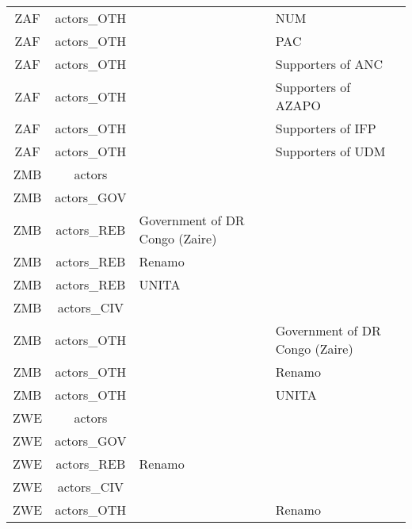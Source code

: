 \documentclass[12pt]{article}
\begin{document}
\begin{center}
\begin{longtable}{|c|c|p{7cm}|p{7cm}|}
  ZAF & actors\_OTH &  & NUM \\ 
  ZAF & actors\_OTH &  & PAC \\ 
  ZAF & actors\_OTH &  & Supporters of ANC \\ 
  ZAF & actors\_OTH &  & Supporters of AZAPO \\ 
  ZAF & actors\_OTH &  & Supporters of IFP \\ 
  ZAF & actors\_OTH &  & Supporters of UDM \\ 
  ZMB & actors &  &  \\ 
  ZMB & actors\_GOV &  &  \\ 
  ZMB & actors\_REB & Government of DR Congo (Zaire) &  \\ 
  ZMB & actors\_REB & Renamo &  \\ 
  ZMB & actors\_REB & UNITA &  \\ 
  ZMB & actors\_CIV &  &  \\ 
  ZMB & actors\_OTH &  & Government of DR Congo (Zaire) \\ 
  ZMB & actors\_OTH &  & Renamo \\ 
  ZMB & actors\_OTH &  & UNITA \\ 
  ZWE & actors &  &  \\ 
  ZWE & actors\_GOV &  &  \\ 
  ZWE & actors\_REB & Renamo &  \\ 
  ZWE & actors\_CIV &  &  \\ 
  ZWE & actors\_OTH &  & Renamo \\ 
\end{longtable}
\end{center}
\end{document}
